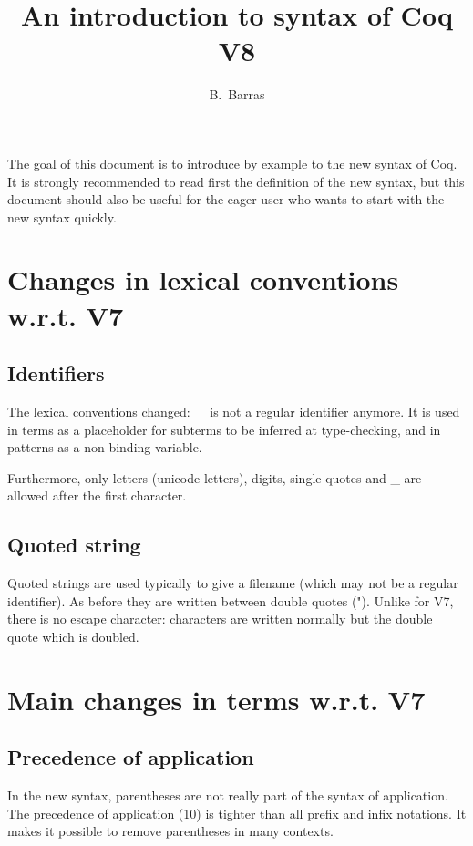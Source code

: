 \documentclass{article}
\author{B.~Barras}
\title{An introduction to syntax of Coq V8}
\def\TERM#1{\textsf{\bf #1}}
\begin{document}
\maketitle

The goal of this document is to introduce by example to the new syntax of
Coq. It is strongly recommended to read first the definition of the new
syntax, but this document should also be useful for the eager user who wants
to start with the new syntax quickly.


\section{Changes in lexical conventions w.r.t. V7}

\subsection{Identifiers}

The lexical conventions changed: \TERM{_} is not a regular identifier
anymore. It is used in terms as a placeholder for subterms to be inferred
at type-checking, and in patterns as a non-binding variable.

Furthermore, only letters (unicode letters), digits, single quotes and
_ are allowed after the first character.

\subsection{Quoted string}

Quoted strings are used typically to give a filename (which may not
be a regular identifier). As before they are written between double
quotes ("). Unlike for V7, there is no escape character: characters
are written normally but the double quote which is doubled.

\section{Main changes in terms w.r.t. V7}


\subsection{Precedence of application}

In the new syntax, parentheses are not really part of the syntax of
application. The precedence of application (10) is tighter than all
prefix and infix notations. It makes it possible to remove parentheses
in many contexts.
\end{document}
